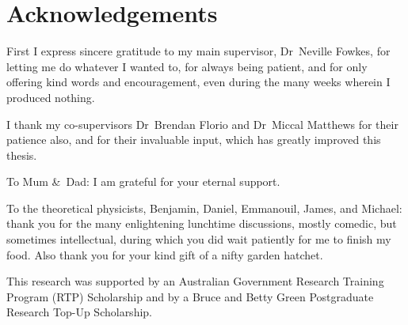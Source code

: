 \chapter{Acknowledgements}
\label{ch:acknowledgements}

\begin{loosecontent}

First I express sincere gratitude to my main supervisor,
Dr~Neville Fowkes,
for letting me do whatever I wanted to,
for always being patient,
and for only offering kind words and encouragement,
even during the many weeks wherein I produced nothing.

I thank my co-supervisors
Dr~Brendan Florio and Dr~Miccal Matthews
for their patience also,
and for their invaluable input,
which has greatly improved this thesis.

To Mum \&~Dad:
I am grateful for your eternal support.

To the theoretical physicists,
Benjamin, Daniel, Emmanouil, James, and Michael:
thank you for the many enlightening lunchtime discussions,
mostly comedic, but sometimes intellectual,
during which you did wait patiently for me to finish my food.
Also thank you for your kind gift of a nifty garden hatchet.

\end{loosecontent}

\thematicbreak

This research was supported
by an Australian Government Research Training Program (RTP) Scholarship
and by a Bruce and Betty Green Postgraduate Research Top-Up Scholarship.
